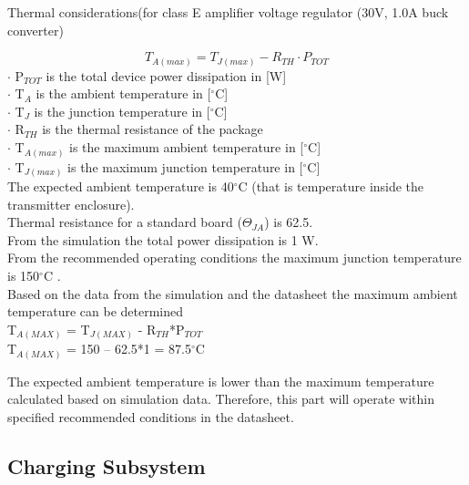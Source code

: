 \documentclass[12pt]{article}
\begin{document}
\pagebreak

\noindent
Thermal considerations(for class E amplifier voltage regulator (30V, 1.0A buck converter) 

\begin{equation}
T_{A(max)} = T_{J(max)} - R_{TH} \cdot P_{TOT}
\end{equation}
\noindent
$\cdot $ P$_{TOT}$ is the total device power dissipation in [W]
\\
\noindent
$\cdot $ T$_A$ is the ambient temperature in [$^\circ$C]
\\
\noindent
$\cdot $ T$_J$ is the junction temperature in [$^\circ$C]
\\
\noindent
$\cdot $ R$_{TH}$ is the thermal resistance of the package 
\\
\noindent
$\cdot $ T$_{A(max)}$ is the maximum ambient temperature in [$^\circ$C]
\\
\noindent
$\cdot $ T$_{J(max)}$ is the maximum junction temperature in [$^\circ$C]
\\

\noindent
The expected ambient temperature is 40$^\circ$C (that is temperature inside the transmitter enclosure).\\
Thermal resistance for a standard board ($\Theta_{JA}$) is 62.5 \cite{TPS54160}.\\
From the simulation the total power dissipation is 1 W.\\
From the recommended operating conditions the maximum junction temperature is 150$^\circ$C \cite{TPS54160}.\\
Based on the data from the simulation and the datasheet the maximum ambient temperature can be determined\\
T$_{A(MAX)}$ = T$_{J(MAX)}$ - R$_{TH}$*P$_{TOT}$ \\
T$_{A(MAX)}$ = 150 – 62.5*1 = 87.5$^\circ$C

\hfill
\pagebreak
\hfill

\indent
The expected ambient temperature is lower than the maximum temperature calculated based on simulation data. Therefore, this part will operate within specified recommended conditions in the datasheet.

\subsection{Charging Subsystem}
\end{document}
